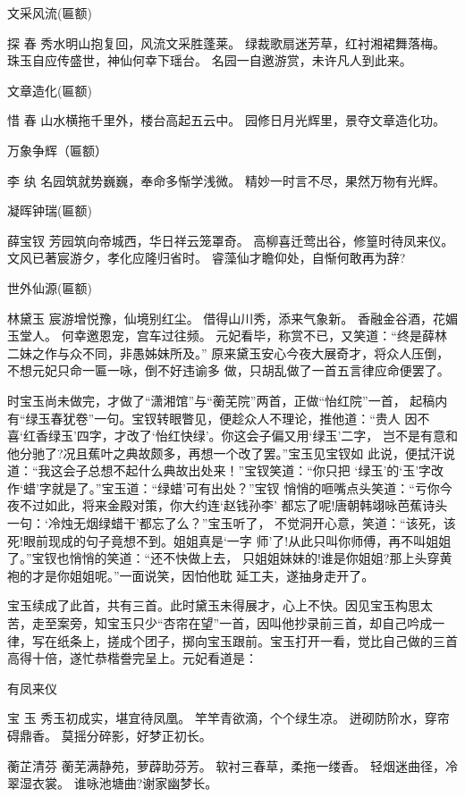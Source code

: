 文采风流(匾额)

探
春
秀水明山抱复回，风流文采胜蓬莱。
绿裁歌扇迷芳草，红衬湘裙舞落梅。
珠玉自应传盛世，神仙何幸下瑶台。
名园一自邀游赏，未许凡人到此来。

文章造化(匾额)

惜
春
山水横拖千里外，楼台高起五云中。
园修日月光辉里，景夺文章造化功。

万象争辉（匾额）

李
纨
名园筑就势巍巍，奉命多惭学浅微。
精妙一时言不尽，果然万物有光辉。

凝晖钟瑞(匾额)

薛宝钗
芳园筑向帝城西，华日祥云笼罩奇。
高柳喜迁莺出谷，修篁时待凤来仪。
文风已著宸游夕，孝化应隆归省时。
睿藻仙才瞻仰处，自惭何敢再为辞?

世外仙源(匾额)

林黛玉
宸游增悦豫，仙境别红尘。
借得山川秀，添来气象新。
香融金谷酒，花媚玉堂人。
何幸邀恩宠，宫车过往频。
元妃看毕，称赏不已，又笑道：“终是薛林二妹之作与众不同，非愚姊妹所及。”
原来黛玉安心今夜大展奇才，将众人压倒，不想元妃只命一匾一咏，倒不好违谕多
做，只胡乱做了一首五言律应命便罢了。

时宝玉尚未做完，才做了“潇湘馆”与“蘅芜院”两首，正做“怡红院”一首，
起稿内有“绿玉春犹卷”一句。宝钗转眼瞥见，便趁众人不理论，推他道：“贵人
因不喜‘红香绿玉’四字，才改了‘怡红快绿’。你这会子偏又用‘绿玉’二字，
岂不是有意和他分驰了?况且蕉叶之典故颇多，再想一个改了罢。”宝玉见宝钗如
此说，便拭汗说道：“我这会子总想不起什么典故出处来！”宝钗笑道：“你只把
‘绿玉’的‘玉’字改作‘蜡’字就是了。”宝玉道：“绿蜡’可有出处？”宝钗
悄悄的咂嘴点头笑道：“亏你今夜不过如此，将来金殿对策，你大约连‘赵钱孙李’
都忘了呢!唐朝韩翊咏芭蕉诗头一句：‘冷烛无烟绿蜡干’都忘了么？”宝玉听了，
不觉洞开心意，笑道：“该死，该死!眼前现成的句子竟想不到。姐姐真是‘一字
师’了!从此只叫你师傅，再不叫姐姐了。”宝钗也悄悄的笑道：“还不快做上去，
只姐姐妹妹的!谁是你姐姐?那上头穿黄袍的才是你姐姐呢。”一面说笑，因怕他耽
延工夫，遂抽身走开了。

宝玉续成了此首，共有三首。此时黛玉未得展才，心上不快。因见宝玉构思太
苦，走至案旁，知宝玉只少“杏帘在望”一首，因叫他抄录前三首，却自己吟成一
律，写在纸条上，搓成个团子，掷向宝玉跟前。宝玉打开一看，觉比自己做的三首
高得十倍，遂忙恭楷誊完呈上。元妃看道是：

有凤来仪

宝
玉
秀玉初成实，堪宜待凤凰。
竿竿青欲滴，个个绿生凉。
迸砌防阶水，穿帘碍鼎香。
莫摇分碎影，好梦正初长。

蘅芷清芬
蘅芜满静苑，萝薜助芬芳。
软衬三春草，柔拖一缕香。
轻烟迷曲径，冷翠湿衣裳。
谁咏池塘曲?谢家幽梦长。

